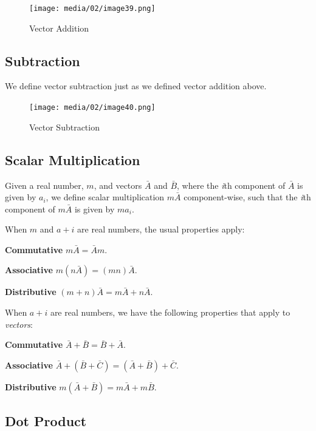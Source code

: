 \documentclass[
]{book}
\begin{document}
\begin{figure}
\centering
\texttt{[image: media/02/image39.png]}
\caption{Vector Addition}
\end{figure}

\hypertarget{subtraction}{%
\subsection{Subtraction}\label{subtraction}}

We define vector subtraction just as we defined vector addition above.

\begin{figure}
\centering
\texttt{[image: media/02/image40.png]}
\caption{Vector Subtraction}
\end{figure}

\hypertarget{scalar-multiplication}{%
\subsection{Scalar Multiplication}\label{scalar-multiplication}}

Given a real number, \(m\), and vectors \(\bar{A}\) and \(\bar{B}\), where the \emph{i}th component of \(\bar{A}\) is given by \(a_i\), we define scalar multiplication \(m \bar{A}\) component-wise, such that the \emph{i}th component of \(m \bar{A}\) is given by \(m a_i\).

When \(m\) and \(a+i\) are real numbers, the usual properties apply:

\textbf{Commutative} \(m \bar{A} = \bar{A} m\).

\textbf{Associative} \(m (n \bar{A}) = (mn) \bar{A}\).

\textbf{Distributive} \((m + n) \bar{A} = m \bar{A} + n \bar{A}\).

When \(a+i\) are real numbers, we have the following properties that apply to \emph{vectors}:

\textbf{Commutative} \(\bar{A} + \bar{B} = \bar{B} + \bar{A}\).

\textbf{Associative} \(\bar{A} + (\bar{B} + \bar{C}) = (\bar{A} + \bar{B}) + \bar{C}\).

\textbf{Distributive} \(m (\bar{A} + \bar{B}) = m \bar{A} + m \bar{B}\).

\hypertarget{dot-product}{%
\subsection{Dot Product}\label{dot-product}}
\end{document}
